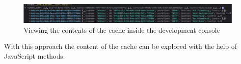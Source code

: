\ifshowImages
\begin{figure}[H]
    \centering
    \includegraphics[width=1\linewidth]{images/background/apollo/apollo-cache-browser-window.jpeg}
    \caption{Viewing the contents of the cache inside the development console}\label{fig:background:graphql:apollo:apollo-cache-browser-window}
\end{figure}
\fi

With this approach the content of the cache can be explored with the help of JavaScript methods.





